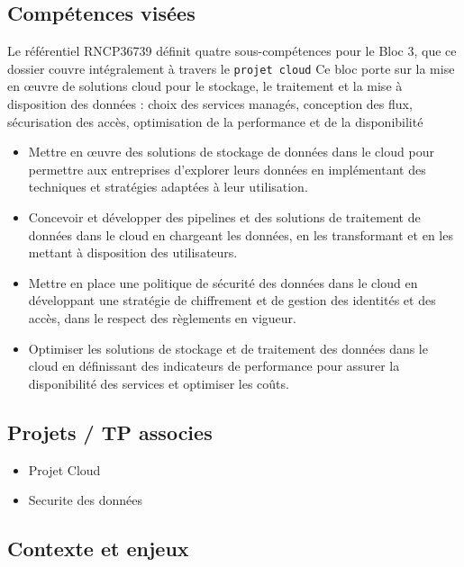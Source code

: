 \documentclass{article}
\begin{document}
\subsection{Compétences visées}

Le référentiel RNCP36739 définit quatre sous-compétences pour le Bloc 3, que ce
dossier couvre intégralement à travers le \texttt{projet cloud}  Ce bloc porte sur
la mise en œuvre de solutions cloud pour le stockage, le traitement et la mise à
disposition des données : choix des services managés, conception des flux, sécurisation
des accès, optimisation de la performance et de la disponibilité

\begin{itemize}[leftmargin=1.4em, itemsep=3pt, topsep=3pt]
    \item Mettre en \oe{}uvre des solutions de stockage de données dans le cloud pour
          permettre aux entreprises d'explorer leurs données en implémentant des
          techniques et stratégies adaptées à leur utilisation.
    \item Concevoir et développer des pipelines et des solutions de traitement de
          données dans le cloud en chargeant les données, en les transformant et en les
          mettant à disposition des utilisateurs.
    \item Mettre en place une politique de sécurité des données dans le cloud en
          développant une stratégie de chiffrement et de gestion des identités et des
          accès, dans le respect des règlements en vigueur.
    \item Optimiser les solutions de stockage et de traitement des données dans le
          cloud en définissant des indicateurs de performance pour assurer la
          disponibilité des services et optimiser les coûts.
\end{itemize}

\subsection{Projets / TP associes}

\begin{itemize}
    \item Projet Cloud
    \item Securite des données
\end{itemize}

\subsection{Contexte et enjeux}
\end{document}
